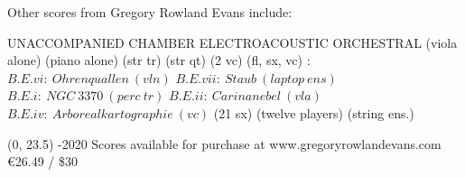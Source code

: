 \documentclass[11pt]{article}
\begin{document}

\begin{center}
\fontsize{.6cm}{1em}\selectfont Other scores from Gregory Rowland Evans include: \hfill
\end{center}
\vspace*{4\baselineskip}
{
\begin{center}
\setlength{\columnseprule}{1pt}
\setlength{\columnsep}{6em}

\begin{paracol}{4}
\fontsize{.3cm}{1em}\selectfont UNACCOMPANIED
\switchcolumn[1]
\fontsize{.3cm}{1em}\selectfont CHAMBER
\switchcolumn[2]
\fontsize{.3cm}{1em}\selectfont ELECTROACOUSTIC
\switchcolumn[3]
\fontsize{.3cm}{1em}\selectfont ORCHESTRAL
\switchcolumn[0]
\fontsize{.1cm}{0.5em}  (viola alone)
\switchcolumn[0]
\fontsize{.1cm}{0.5em}  (piano alone)
\switchcolumn[1]
\fontsize{.1cm}{0.5em} 
\switchcolumn[1]
\fontsize{.1cm}{0.5em}  (str tr)
\switchcolumn[1]
\fontsize{.1cm}{0.5em}  (str qt)
\switchcolumn[1]
\fontsize{.1cm}{0.5em}  (2 vc)
\switchcolumn[1]
\fontsize{.1cm}{0.5em}  (fl, sx, vc)
\switchcolumn[2]
\fontsize{.1cm}{0.5em} :
\switchcolumn[2]
\fontsize{.05cm}{0.5em}  $B.E.vi: \ Ohrenquallen \ (vln)$
\switchcolumn[2]
\fontsize{.05cm}{0.5em}  $B.E.vii: \ Staub \ (laptop \ ens)$
\switchcolumn[2]
\fontsize{.05cm}{0.5em}  $B.E.i: \ NGC \ 3370 \ (perc \ tr)$
\switchcolumn[2]
\fontsize{.05cm}{0.5em}  $B.E.ii: \ Carinanebel \ (vla)$
\switchcolumn[2]
 \fontsize{.05cm}{0.5em} $B.E.iv: \ Arborealkartographie \ (vc)$
\switchcolumn[3]
\fontsize{.1cm}{0.5em} 
\switchcolumn[3]
\fontsize{.1cm}{0.5em}  (21 sx)
\switchcolumn[3]
\fontsize{.1cm}{0.5em}  (twelve players)
\switchcolumn[3]
\fontsize{.1cm}{0.5em}  (string ens.)


\end{paracol}
\end{center}
}

\begin{textblock}{23}(0, 23.5)
-2020 \hfill
Scores available for purchase at www.gregoryrowlandevans.com \hfill
\euro 26.49 / \$30
\end{textblock}
\end{document}
